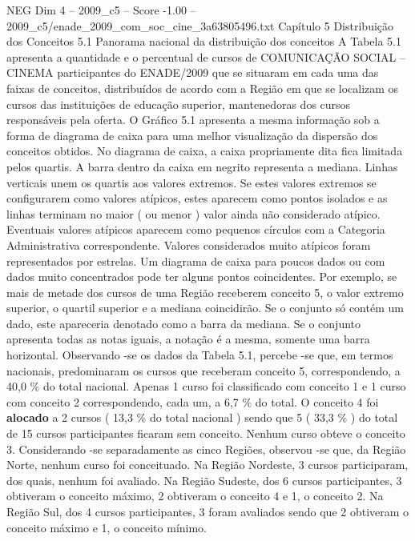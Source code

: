 \begin{textsample}{NEG Dim 4 – 2009\_c5 – Score -1.00 – 2009\_c5/enade\_2009\_com\_soc\_cine\_3a63805496.txt}  \label{ex:f4_neg_082}
Capítulo 5 Distribuição dos Conceitos 5.1 Panorama nacional da distribuição dos conceitos A Tabela 5.1 apresenta a quantidade e o percentual de cursos de COMUNICAÇÃO SOCIAL – CINEMA participantes do ENADE/2009 que se situaram em cada uma das faixas de conceitos, distribuídos de acordo com a Região em que se localizam os cursos das instituições de educação superior, mantenedoras dos cursos responsáveis pela oferta.
O Gráfico 5.1 apresenta a mesma informação sob a forma de diagrama de caixa para uma melhor visualização da dispersão dos conceitos obtidos.
No diagrama de caixa, a caixa propriamente dita fica limitada pelos quartis.
A barra dentro da caixa em negrito representa a mediana.
Linhas verticais unem os quartis aos valores extremos.
Se estes valores extremos se configurarem como valores atípicos, estes aparecem como pontos isolados e as linhas terminam no maior ( ou menor ) valor ainda não considerado atípico.
Eventuais valores atípicos aparecem como pequenos círculos com a Categoria Administrativa correspondente.
Valores considerados muito atípicos foram representados por estrelas.
Um diagrama de caixa para poucos dados ou com dados muito concentrados pode ter alguns pontos coincidentes.
Por exemplo, se mais de metade dos cursos de uma Região receberem conceito 5, o valor extremo superior, o quartil superior e a mediana coincidirão.
Se o conjunto só contém um dado, este apareceria denotado como a barra da mediana.
Se o conjunto apresenta todas as notas iguais, a notação é a mesma, somente uma barra horizontal.
Observando -se os dados da Tabela 5.1, percebe -se que, em termos nacionais, predominaram os cursos que receberam conceito 5, correspondendo, a 40,0 \% do total nacional.
Apenas 1 curso foi classificado com conceito 1 e 1 curso com conceito 2 correspondendo, cada um, a 6,7 \% do total.
O conceito 4 foi \textbf{alocado} a 2 cursos ( 13,3 \% do total nacional ) sendo que 5 ( 33,3 \% ) do total de 15 cursos participantes ficaram sem conceito.
Nenhum curso obteve o conceito 3.
Considerando -se separadamente as cinco Regiões, observou -se que, da Região Norte, nenhum curso foi conceituado.
Na Região Nordeste, 3 cursos participaram, dos quais, nenhum foi avaliado.
Na Região Sudeste, dos 6 cursos participantes, 3 obtiveram o conceito máximo, 2 obtiveram o conceito 4 e 1, o conceito 2.
Na Região Sul, dos 4 cursos participantes, 3 foram avaliados sendo que 2 obtiveram o conceito máximo e 1, o conceito mínimo.

\end{textsample}
